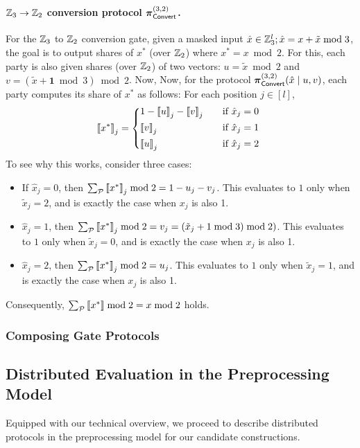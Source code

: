 \paragraph{$\mathbb{Z}_3 \to \mathbb{Z}_2$ conversion protocol $\boldsymbol{\pi}_{\textsf{Convert}}^{(3,2)}$.}
For the $\mathbb{Z}_3$ to $\mathbb{Z}_2$ conversion gate, given a masked input $\hat{x} \in \mathbb{Z}_3^l; \hat{x} = x + \tilde{x} \bmod 3$, the goal is to output shares of $x^*$ (over $\mathbb{Z}_2$) where $x^*  = x \bmod 2$. For this, each party is also given shares (over $\mathbb{Z}_2$) of two vectors: $u = \tilde{x} \bmod 2$ and $v = (\tilde{x} + \textbf{1} \bmod 3) \bmod 2$. Now,  Now, for the protocol $\boldsymbol{\pi}_{\textsf{Convert}}^{(3,2)}(\hat{x} \mid u, v)$, each party computes its share of $x^*$ as follows: For each position $j \in [l]$,
\[
\share{x^*}_j = 
\begin{cases*}
       1 - \share{u}_j - \share{v}_j  & \quad if $\hat{x}_j = 0$ \\
       \share{v}_j & \quad if $\hat{x}_j = 1$ \\
       \share{u}_j & \quad if $\hat{x}_j = 2$
\end{cases*}
\]
To see why this works, consider three cases:
\begin{itemize}
\item If $\hat{x}_j = 0$, then $\sum_{\mathcal{P}} \left\llbracket x^* \right\rrbracket_j \bmod 2 = 1 - u_j - v_j$. This evaluates to $1$ only when $\tilde{x}_j = 2$, and is exactly the case when $x_j$ is also 1.

\item $\hat{x}_j = 1$, then $\sum_{\mathcal{P}} \left\llbracket x^* \right\rrbracket_j \bmod 2 = v_j = (\tilde{x}_j + 1 \bmod 3) \bmod 2)$. This evaluates to $1$ only when $\tilde{x}_j = 0$, and is exactly the case when $x_j$ is also 1.

\item $\hat{x}_j = 2$, then $\sum_{\mathcal{P}} \left\llbracket x^* \right\rrbracket_j \bmod 2 = u_j$. This evaluates to $1$ only when $\tilde{x}_j = 1$, and is exactly the case when $x_j$ is also 1.
\end{itemize}
Consequently, $\sum_{\mathcal{P}} \left\llbracket x^* \right\rrbracket \bmod 2 = x \bmod 2$ holds.


\subsubsection{Composing Gate Protocols}

\subsection{Distributed Evaluation in the Preprocessing Model}
Equipped with our technical overview, we proceed to describe distributed protocols in the preprocessing model for our candidate constructions. 

